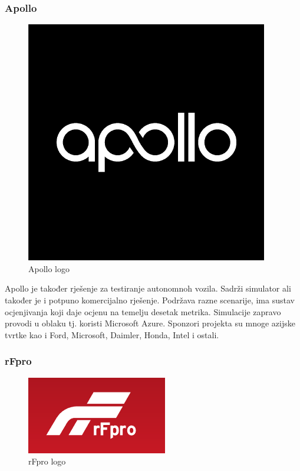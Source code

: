 \subsubsection{Apollo}
\begin{figure}[ht!]
  \centering
  \includegraphics[scale=0.5]{images/apollo_logo.png}
  \caption{Apollo logo}
\end{figure}

Apollo je također rješenje za testiranje autonomnoh vozila. Sadrži simulator ali također je i potpuno komercijalno rješenje. Podržava razne scenarije, ima sustav ocjenjivanja koji daje ocjenu na temelju desetak metrika. Simulacije zapravo provodi u oblaku tj. koristi Microsoft Azure. Sponzori projekta su mnoge azijske tvrtke kao i Ford, Microsoft, Daimler, Honda, Intel i ostali.

\subsubsection{rFpro}
\begin{figure}[ht!]
  \centering
  \includegraphics[scale=0.5]{images/rfpro_logo.png}
  \caption{rFpro logo}
\end{figure}

